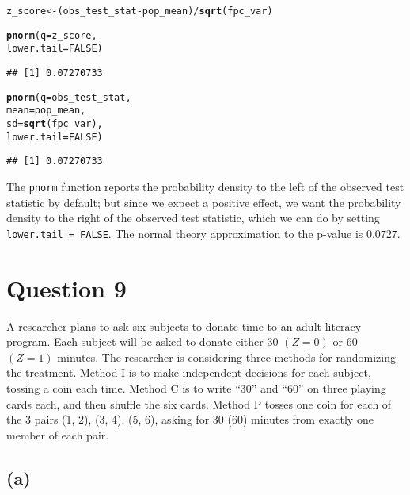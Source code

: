 \documentclass[11pt]{article}\usepackage[]{graphicx}\usepackage[]{color}
\makeatletter
\newcommand{\hlnum}[1]{\textcolor[rgb]{0.686,0.059,0.569}{#1}}%
\newcommand{\hlopt}[1]{\textcolor[rgb]{0,0,0}{#1}}%
\newcommand{\hlstd}[1]{\textcolor[rgb]{0.345,0.345,0.345}{#1}}%
\newcommand{\hlkwb}[1]{\textcolor[rgb]{0.69,0.353,0.396}{#1}}%
\newcommand{\hlkwc}[1]{\textcolor[rgb]{0.333,0.667,0.333}{#1}}%
\newcommand{\hlkwd}[1]{\textcolor[rgb]{0.737,0.353,0.396}{\textbf{#1}}}%
\newenvironment{kframe}{%
 \def\at@end@of@kframe{}%
 \ifinner\ifhmode%
  \def\at@end@of@kframe{\end{minipage}}%
  \begin{minipage}{\columnwidth}%
 \fi\fi%
 \def\FrameCommand##1{\hskip\@totalleftmargin \hskip-\fboxsep
 \colorbox{shadecolor}{##1}\hskip-\fboxsep
     \hskip-\linewidth \hskip-\@totalleftmargin \hskip\columnwidth}%
 \MakeFramed {\advance\hsize-\width
   \@totalleftmargin\z@ \linewidth\hsize
   \@setminipage}}%
 {\par\unskip\endMakeFramed%
 \at@end@of@kframe}
\newenvironment{knitrout}{}{} %
\theoremstyle{newstyle}
\makeatother
\begin{document}
\begin{knitrout}
\color{fgcolor}\begin{kframe}
\begin{alltt}
\hlstd{z_score} \hlkwb{<-} \hlstd{(obs_test_stat} \hlopt{-} \hlstd{pop_mean)} \hlopt{/} \hlkwd{sqrt}\hlstd{(fpc_var)}

\hlkwd{pnorm}\hlstd{(}\hlkwc{q} \hlstd{= z_score,}
      \hlkwc{lower.tail} \hlstd{=} \hlnum{FALSE}\hlstd{)}
\end{alltt}
\begin{verbatim}
## [1] 0.07270733
\end{verbatim}
\begin{alltt}
\hlkwd{pnorm}\hlstd{(}\hlkwc{q} \hlstd{= obs_test_stat,}
      \hlkwc{mean} \hlstd{= pop_mean,}
      \hlkwc{sd} \hlstd{=} \hlkwd{sqrt}\hlstd{(fpc_var),}
      \hlkwc{lower.tail} \hlstd{=} \hlnum{FALSE}\hlstd{)}
\end{alltt}
\begin{verbatim}
## [1] 0.07270733
\end{verbatim}
\end{kframe}
\end{knitrout}

The \texttt{pnorm} function reports the probability density to the left of the observed test statistic by default; but since we expect a positive effect, we want the probability density to the right of the observed test statistic, which we can do by setting \texttt{lower.tail = FALSE}. The normal theory approximation to the p-value is $0.0727$. 

\section{Question 9}

A researcher plans to ask six subjects to donate time to an adult literacy program. Each subject will be asked to donate either $30$ $(Z = 0)$ or $60$ $(Z = 1)$ minutes. The researcher is considering three methods for randomizing the treatment. Method I is to make independent decisions for each subject, tossing a coin each time. Method C is to write ``30'' and ``60'' on three playing cards each, and then shuffle the six cards. Method P tosses one coin for each of the 3 pairs (1, 2), (3, 4), (5, 6), asking for 30 (60) minutes from exactly one member of each pair.

\subsection{(a)}
\end{document}
